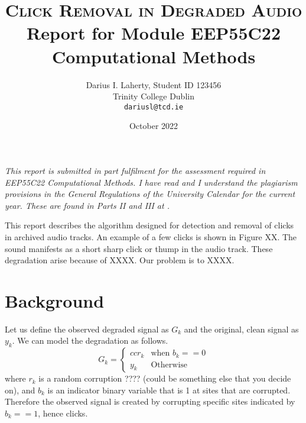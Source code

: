 \documentclass[11pt, a4paper]{article}
\begin{document}
\title{\textbf{\textsc{\Huge Click Removal in Degraded Audio}}\\ {\Large Report for Module EEP55C22 Computational Methods}}
\author{Darius I. Laherty, Student ID 123456 \\ Trinity College Dublin \\ {\tt dariusl@tcd.ie}}

\date{October 2022}

\maketitle

\begin{center}
\begin{minipage}[t]{0.75\linewidth}
\textit{
This report is submitted in part fulfilment for the assessment required in EEP55C22 Computational Methods.  I have read and I understand the plagiarism provisions in the General Regulations of the University Calendar for the current year. These are found in Parts II and III at .}
\end{minipage}
\end{center}

This report describes the algorithm designed for detection and removal of clicks in archived audio tracks. An example of a few clicks is shown in Figure XX. The sound manifests as a short sharp click or thump in the audio track. These degradation arise because of XXXX. Our problem is to XXXX.

\section{Background}
Let us define the observed degraded signal as $G_k$ and the original, clean signal as $y_k$. 
We can model the degradation as follows.
\begin{equation}
  G_k = \begin{cases}{cc}
              r_k & \text{when $b_k == 0$} \\
              y_k & \text{Otherwise}
              \end{cases}
\end{equation}
 where $r_k$ is a random corruption ???? (could be something else that you decide on), and $b_k$ is an indicator binary variable that is 1 at sites that are corrupted.
 Therefore the observed signal is created by corrupting specific sites indicated by $b_k == 1$, hence clicks.
 
\end{document}
